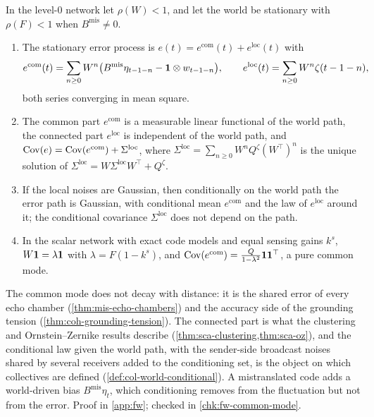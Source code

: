 \begin{lemma}\label{lem:fw-common-mode}
In the level-0 network let $\rho(W)<1$, and let the world be stationary with $\rho(F)<1$ when $B^{\mathrm{mis}}\ne0$.
\begin{enumerate}
\item[(a)] The stationary error process is $e(t)=e^{\mathrm{com}}(t)+e^{\mathrm{loc}}(t)$ with
\begin{equation}\label{eq:fw-common-mode}
e^{\mathrm{com}}(t)=\sum_{n\ge0}W^n\bigl(B^{\mathrm{mis}}\eta_{t-1-n}-\mathbf{1}\otimes w_{t-1-n}\bigr),\qquad e^{\mathrm{loc}}(t)=\sum_{n\ge0}W^n\zeta(t-1-n),
\end{equation}
both series converging in mean square.
\item[(b)] The common part $e^{\mathrm{com}}$ is a measurable linear functional of the world path, the connected part $e^{\mathrm{loc}}$ is independent of the world path, and $\operatorname{Cov}(e)=\operatorname{Cov}(e^{\mathrm{com}})+\Sigma^{\mathrm{loc}}$, where $\Sigma^{\mathrm{loc}}=\sum_{n\ge0}W^nQ^\zeta(W^\top)^n$ is the unique solution of $\Sigma^{\mathrm{loc}}=W\Sigma^{\mathrm{loc}}W^\top+Q^\zeta$.
\item[(c)] If the local noises are Gaussian, then conditionally on the world path the error path is Gaussian, with conditional mean $e^{\mathrm{com}}$ and the law of $e^{\mathrm{loc}}$ around it; the conditional covariance $\Sigma^{\mathrm{loc}}$ does not depend on the path.
\item[(d)] In the scalar network with exact code models and equal sensing gains $k^s$, $W\mathbf{1}=\lambda\mathbf{1}$ with $\lambda=F(1-k^s)$, and $\operatorname{Cov}(e^{\mathrm{com}})=\frac{Q}{1-\lambda^2}\mathbf{1}\mathbf{1}^\top$, a pure common mode.
\end{enumerate}
\end{lemma}

The common mode does not decay with distance: it is the shared error of every echo chamber (\cref{thm:mis-echo-chambers}) and the accuracy side of the grounding tension (\cref{thm:coh-grounding-tension}). The connected part is what the clustering and Ornstein--Zernike results describe (\cref{thm:sca-clustering,thm:sca-oz}), and the conditional law given the world path, with the sender-side broadcast noises shared by several receivers added to the conditioning set, is the object on which collectives are defined (\cref{def:col-world-conditional}). A mistranslated code adds a world-driven bias $B^{\mathrm{mis}}\eta_t$, which conditioning removes from the fluctuation but not from the error. Proof in \cref{app:fw}; checked in \cref{chk:fw-common-mode}.
